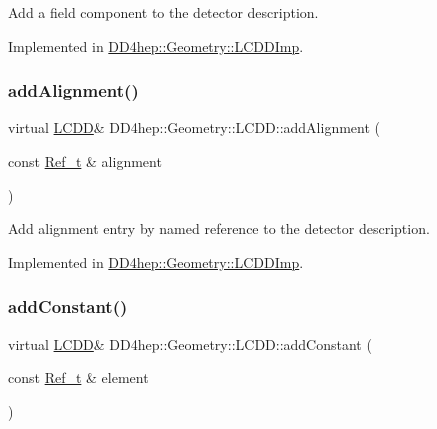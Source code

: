 Add a field component to the detector description. 



Implemented in \hyperlink{class_d_d4hep_1_1_geometry_1_1_l_c_d_d_imp_aefc75f3c9c031176d3d3e5eafe091716}{D\+D4hep\+::\+Geometry\+::\+L\+C\+D\+D\+Imp}.

\hypertarget{class_d_d4hep_1_1_geometry_1_1_l_c_d_d_a50e3654851b950da20f19a13e36fbcc4}{}\label{class_d_d4hep_1_1_geometry_1_1_l_c_d_d_a50e3654851b950da20f19a13e36fbcc4} 
\subsubsection{\texorpdfstring{add\+Alignment()}{addAlignment()}}
{\footnotesize\ttfamily virtual \hyperlink{class_d_d4hep_1_1_geometry_1_1_l_c_d_d}{L\+C\+DD}\& D\+D4hep\+::\+Geometry\+::\+L\+C\+D\+D\+::add\+Alignment (\begin{DoxyParamCaption}\item[{const \hyperlink{group___d_d4_h_e_p___g_e_o_m_e_t_r_y_ga40af83be6718bb8828a3d83dc7f8c930}{Ref\+\_\+t} \&}]{alignment }\end{DoxyParamCaption})\hspace{0.3cm}{\ttfamily [pure virtual]}}



Add alignment entry by named reference to the detector description. 



Implemented in \hyperlink{class_d_d4hep_1_1_geometry_1_1_l_c_d_d_imp_a408e628b36591e17b7f44f7c3246be39}{D\+D4hep\+::\+Geometry\+::\+L\+C\+D\+D\+Imp}.

\hypertarget{class_d_d4hep_1_1_geometry_1_1_l_c_d_d_ac2bc82eba942bd452da56bbf958d8aad}{}\label{class_d_d4hep_1_1_geometry_1_1_l_c_d_d_ac2bc82eba942bd452da56bbf958d8aad} 
\subsubsection{\texorpdfstring{add\+Constant()}{addConstant()}}
{\footnotesize\ttfamily virtual \hyperlink{class_d_d4hep_1_1_geometry_1_1_l_c_d_d}{L\+C\+DD}\& D\+D4hep\+::\+Geometry\+::\+L\+C\+D\+D\+::add\+Constant (\begin{DoxyParamCaption}\item[{const \hyperlink{group___d_d4_h_e_p___g_e_o_m_e_t_r_y_ga40af83be6718bb8828a3d83dc7f8c930}{Ref\+\_\+t} \&}]{element }\end{DoxyParamCaption})\hspace{0.3cm}{\ttfamily [pure virtual]}}



